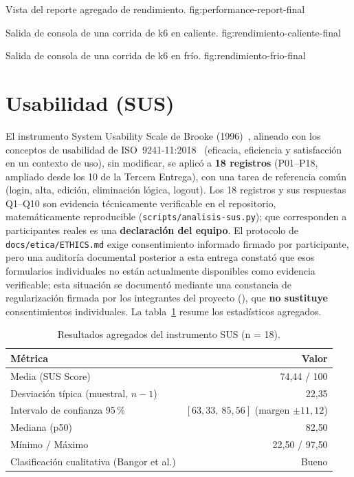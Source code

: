 %
{Vista del reporte agregado de rendimiento.}%
{fig:performance-report-final}

%
{Salida de consola de una corrida de k6 en caliente.}%
{fig:rendimiento-caliente-final}

%
{Salida de consola de una corrida de k6 en fr\'io.}%
{fig:rendimiento-frio-final}

\section{Usabilidad (SUS)}
\label{sec:sus-final}

El instrumento System Usability Scale de Brooke (1996)~\cite{sus-brooke1996},
alineado con los conceptos de usabilidad de
ISO~9241-11:2018~\cite{iso9241-11} (eficacia, eficiencia y satisfacci\'on
en un contexto de uso), sin modificar, se aplic\'o a \textbf{18
registros} (P01--P18, ampliado desde los 10 de la Tercera Entrega), con
una tarea de referencia com\'un (login, alta, edici\'on, eliminaci\'on
l\'ogica, logout). Los 18 registros y sus respuestas Q1--Q10 son
evidencia t\'ecnicamente verificable en el repositorio, matem\'aticamente
reproducible (\texttt{scripts/analisis-sus.py}); que corresponden a
participantes reales es una \textbf{declaraci\'on del equipo}. El
protocolo de \texttt{docs/etica/ETHICS.md} exige consentimiento informado
firmado por participante, pero una auditor\'ia documental posterior a
esta entrega constat\'o que esos formularios individuales no est\'an
actualmente disponibles como evidencia verificable; esta situaci\'on se
document\'o mediante una constancia de regularizaci\'on firmada por los
integrantes del proyecto
(),
que \textbf{no sustituye} consentimientos individuales. La
tabla~\ref{tab:sus-final} resume los estad\'isticos agregados.

\begin{table}[H]
  \centering
  \caption{Resultados agregados del instrumento SUS (n = 18).}
  \label{tab:sus-final}
  \begin{tabular}{lr}
    \toprule
    M\'etrica & Valor \\
    \midrule
    Media (SUS Score) & 74{,}44 / 100 \\
    Desviaci\'on t\'ipica (muestral, $n-1$) & 22{,}35 \\
    Intervalo de confianza 95\,\% & $[63{,}33,\ 85{,}56]$ (margen $\pm 11{,}12$) \\
    Mediana (p50) & 82{,}50 \\
    M\'inimo / M\'aximo & 22{,}50 / 97{,}50 \\
    Clasificaci\'on cualitativa (Bangor et al.) & Bueno \\
    \bottomrule
  \end{tabular}
\end{table}

